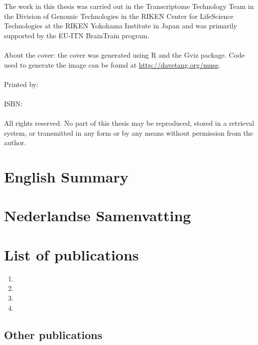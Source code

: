 \documentclass[10pt,a4paper,twoside]{report}
\begin{document}
\newpage

\normalsize
{
   \setlength{\parindent}{0cm}
   The work in this thesis was carried out in the Transcriptome Technology Team in the Division of Genomic Technologies in the RIKEN Center for LifeScience Technologies at the RIKEN Yokohama Institute in Japan and was primarily supported by the EU-ITN BrainTrain program.
   \\
   \\
   About the cover: the cover was generated using R and the Gviz package. Code used to generate the image can be found at \href{http://davetang.org/muse/2015/02/06/thesis-cover-art/}{http://davetang.org/muse}.
   \\
   \\
   Printed by:
   \\
   \\
   ISBN:
   \\
   \\
   All rights reserved. No part of this thesis may be reproduced, stored in a retrieval system, or transmitted in any form or by any means without permission from the author.
}

\chapter*{English Summary}
\small


\chapter*{Nederlandse Samenvatting}

\normalsize

\chapter*{List of publications}

\begin{enumerate}
   \item {}
   \item {}
   \item {}
   \item {}
\end{enumerate}

\section*{Other publications}
\end{document}
